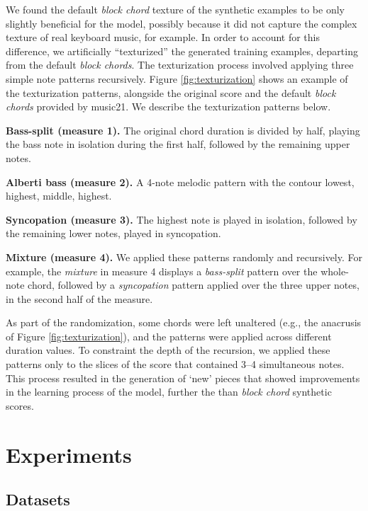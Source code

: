\documentclass{article}
\begin{document}
We found the default \emph{block chord} texture of the synthetic examples to be only slightly beneficial for the model, possibly because it did not capture the complex texture of real keyboard music, for example.
In order to account for this difference, we artificially ``texturized'' the generated training examples, departing from the default \emph{block chords}.
The texturization process involved applying three simple note patterns recursively.
Figure \ref{fig:texturization} shows an example of the texturization patterns, alongside the original score and the default \emph{block chords} provided by music21. We describe the texturization patterns below.

\textbf{Bass-split (measure 1).} The original chord duration is divided by half, playing
the bass note in isolation during the first half, followed by the remaining upper notes.

\textbf{Alberti bass (measure 2).} A 4-note melodic pattern with the contour lowest, highest, middle, highest.

\textbf{Syncopation (measure 3).} The highest note is played in isolation, followed by the remaining lower notes, played in syncopation.

\textbf{Mixture (measure 4).} We applied these patterns randomly and recursively. For example, the \emph{mixture} in measure 4 displays a \emph{bass-split} pattern over the whole-note chord, followed by a \emph{syncopation} pattern applied over the three upper notes, in the second half of the measure. 

As part of the randomization, some chords were left unaltered (e.g., the anacrusis of Figure \ref{fig:texturization}), and the patterns were applied across different duration values. 
To constraint the depth of the recursion, we applied these patterns only to the slices of the score that contained 3--4 simultaneous notes.  
This process resulted in the generation of `new' pieces that showed improvements in the learning process of the model, further the than \emph{block chord} synthetic scores.

\section{Experiments}


\subsection{Datasets}
\end{document}
